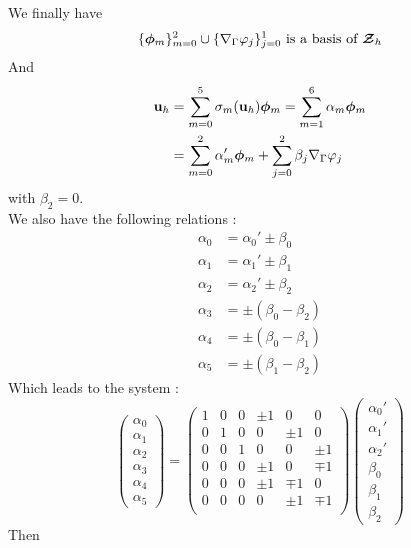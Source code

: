 We finally have \[ \{\bm{\phi}_m\}_{m=0}^2\cup\{{\nabla}_\Gamma\varphi_j\}_{j=0}^1
\mbox{ is a basis of } {\bm{\mathcal{Z}}}_h \]
And
\begin{align*}
{\mathbf{u}}_h &= \sum_{m=0}^5 \sigma_m({\mathbf{u}}_h) \bm{\phi}_m = \sum_{m=1}^6 \alpha_m \bm{\phi}_m\\
&= \sum_{m=0}^2 \alpha_m'\bm{\phi}_m + \sum_{j=0}^2 \beta_j{\nabla}_\Gamma\varphi_j
\end{align*}
with $\beta_2 = 0$.\\

We also have the following relations :
\begin{align*}
\alpha_0 &= \alpha_0' \pm \beta_0\\
\alpha_1 &= \alpha_1' \pm \beta_1\\
\alpha_2 &= \alpha_2' \pm \beta_2\\
\alpha_3 &= \pm(\beta_0-\beta_2)\\
\alpha_4 &= \pm(\beta_0-\beta_1)\\
\alpha_5 &= \pm(\beta_1-\beta_2)
\end{align*}
Which leads to the system :
\[ \begin{pmatrix}
\alpha_0\\\alpha_1\\\alpha_2\\\alpha_3\\\alpha_4\\\alpha_5
\end{pmatrix} = \begin{pmatrix}
1 & 0 & 0 & \pm 1 & 0 & 0\\
0 & 1 & 0 & 0 & \pm 1 & 0\\
0 & 0 & 1 & 0 & 0 & \pm 1\\
0 & 0 & 0 & \pm 1 & 0 & \mp 1\\
0 & 0 & 0 & \pm 1 & \mp 1 & 0\\
0 & 0 & 0 & 0 & \pm 1 & \mp 1\\
\end{pmatrix} \begin{pmatrix}
\alpha_0'\\\alpha_1'\\\alpha_2'\\\beta_0\\\beta_1\\\beta_2
\end{pmatrix} \]
Then
